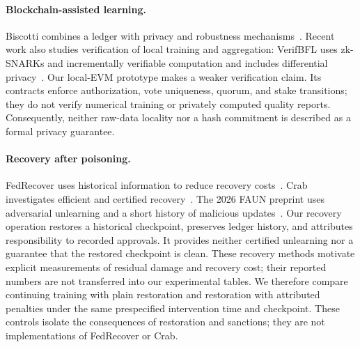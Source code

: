 \paragraph{Blockchain-assisted learning.}
Biscotti combines a ledger with privacy and robustness mechanisms~\cite{shayan2022}.
Recent work also studies verification of local training and aggregation:
VerifBFL uses zk-SNARKs and incrementally verifiable computation and includes
differential privacy~\cite{bellachia2025}. Our local-EVM prototype makes a weaker
verification claim. Its contracts enforce authorization, vote uniqueness, quorum,
and stake transitions; they do not verify numerical training or privately
computed quality reports. Consequently, neither raw-data locality nor a hash
commitment is described as a formal privacy guarantee.

\paragraph{Recovery after poisoning.}
FedRecover uses historical information to reduce recovery
costs~\cite{cao2023recover}. Crab investigates efficient and certified
recovery~\cite{jiang2024}. The 2026 FAUN preprint uses adversarial unlearning
and a short history of malicious updates~\cite{zhao2026}.
Our recovery operation restores a historical checkpoint, preserves ledger history,
and attributes responsibility to recorded approvals. It provides neither certified
unlearning nor a guarantee that the restored checkpoint is clean. These recovery
methods motivate explicit measurements of residual damage and recovery cost;
their reported numbers are not transferred into our experimental tables.
We therefore compare continuing training with plain restoration and restoration
with attributed penalties under the same prespecified intervention time and
checkpoint. These controls isolate the consequences of restoration and sanctions;
they are not implementations of FedRecover or Crab.
